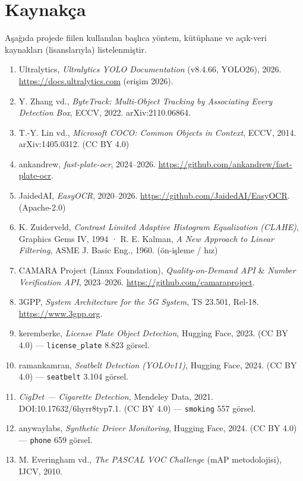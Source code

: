 \documentclass[12pt,a4paper]{article}
\newcommand{\tcode}[1]{\texttt{\small #1}}
\begin{document}
\section{Kaynakça}
{\footnotesize Aşağıda projede fiilen kullanılan başlıca yöntem, kütüphane ve açık-veri kaynakları (lisanslarıyla) listelenmiştir.\par}
\footnotesize\sloppy
\begin{enumerate}\setlength{\itemsep}{0pt}\setlength{\parskip}{0pt}
\item Ultralytics, \textit{Ultralytics YOLO Documentation} (v8.4.66, YOLO26), 2026. \url{https://docs.ultralytics.com} (erişim 2026).
\item Y. Zhang vd., \textit{ByteTrack: Multi-Object Tracking by Associating Every Detection Box}, ECCV, 2022. arXiv:2110.06864.
\item T.-Y. Lin vd., \textit{Microsoft COCO: Common Objects in Context}, ECCV, 2014. arXiv:1405.0312. (CC BY 4.0)
\item ankandrew, \textit{fast-plate-ocr}, 2024--2026. \url{https://github.com/ankandrew/fast-plate-ocr}.
\item JaidedAI, \textit{EasyOCR}, 2020--2026. \url{https://github.com/JaidedAI/EasyOCR}. (Apache-2.0)
\item K. Zuiderveld, \textit{Contrast Limited Adaptive Histogram Equalization (CLAHE)}, Graphics Gems IV, 1994 · R. E. Kalman, \textit{A New Approach to Linear Filtering}, ASME J. Basic Eng., 1960. (ön-işleme / hız)
\item CAMARA Project (Linux Foundation), \textit{Quality-on-Demand API} \& \textit{Number Verification API}, 2023--2026. \url{https://github.com/camaraproject}.
\item 3GPP, \textit{System Architecture for the 5G System}, TS 23.501, Rel-18. \url{https://www.3gpp.org}.
\item keremberke, \textit{License Plate Object Detection}, Hugging Face, 2023. (CC BY 4.0) --- \tcode{license\_plate} 8.823 görsel.
\item ramankamran, \textit{Seatbelt Detection (YOLOv11)}, Hugging Face, 2024. (CC BY 4.0) --- \tcode{seatbelt} 3.104 görsel.
\item \textit{CigDet — Cigarette Detection}, Mendeley Data, 2021. DOI:10.17632/6hyrr8typ7.1. (CC BY 4.0) --- \tcode{smoking} 557 görsel.
\item anywaylabs, \textit{Synthetic Driver Monitoring}, Hugging Face, 2024. (CC BY 4.0) --- \tcode{phone} 659 görsel.
\item M. Everingham vd., \textit{The PASCAL VOC Challenge} (mAP metodolojisi), IJCV, 2010.
\end{enumerate}
\normalsize
\end{document}
